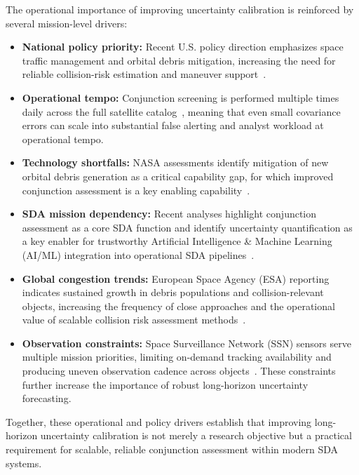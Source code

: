 \documentclass[10pt]{article}
\begin{document}
The operational importance of improving uncertainty calibration is reinforced by several mission-level drivers:

\begin{itemize}
    \item \textbf{National policy priority:} Recent U.S. policy direction emphasizes space traffic management and orbital debris mitigation, increasing the need for reliable collision-risk estimation and maneuver support~\cite{whitehouse_space_superiority_2025}.
    
    \item \textbf{Operational tempo:} Conjunction screening is performed multiple times daily across the full satellite catalog~\cite{nasa_cara, nasa_bestpractices}, meaning that even small covariance errors can scale into substantial false alerting and analyst workload at operational tempo.
    
    \item \textbf{Technology shortfalls:} NASA assessments identify mitigation of new orbital debris generation as a critical capability gap, for which improved conjunction assessment is a key enabling capability~\cite{nasa_civil_space_shortfall_2024}.
    
    \item \textbf{SDA mission dependency:} Recent analyses highlight conjunction assessment as a core SDA function and identify uncertainty quantification as a key enabler for trustworthy Artificial Intelligence \& Machine Learning (AI/ML) integration into operational SDA pipelines~\cite{rand_rra2318_1, rand_rra2318_2}.
    
    \item \textbf{Global congestion trends:} European Space Agency (ESA) reporting indicates sustained growth in debris populations and collision-relevant objects, increasing the frequency of close approaches and the operational value of scalable collision risk assessment methods~\cite{esa_space_environment_report_2025}.
    
    \item \textbf{Observation constraints:} Space Surveillance Network (SSN) sensors serve multiple mission priorities, limiting on-demand tracking availability and producing uneven observation cadence across objects~\cite{nasa_bestpractices, spacetrack_handbook}. These constraints further increase the importance of robust long-horizon uncertainty forecasting.
\end{itemize}

Together, these operational and policy drivers establish that improving long-horizon uncertainty calibration is not merely a research objective but a practical requirement for scalable, reliable conjunction assessment within modern SDA systems.
\end{document}
